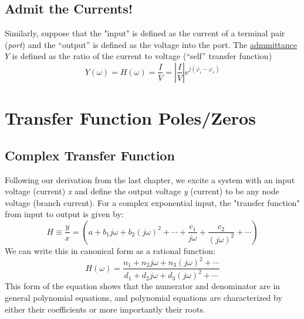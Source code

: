 \subsection{Admit the Currents!}

Similarly, suppose that the "input" is defined as the current of a terminal pair (\textit{port}) and the “output” is defined as the voltage into the port. The \underline{admmittance} $Y$ is defined as the ratio of the current to voltage (“self” transfer function)
 \begin{equation}
Y(\omega ) = H(\omega ) = \frac{I}{V} = \left| {\frac{I}{V}} \right|{e^{j({\varphi _i} - {\varphi _v})}}
\end{equation}




\section{Transfer Function Poles/Zeros}





\subsection{Complex Transfer Function}

Following our derivation from the last chapter, we excite a system with an input voltage (current) \textit{x} and define the output voltage \textit{y} (current) to be any node voltage (branch current).  For a complex exponential input, the "transfer function" from input to output is given by:
\begin{equation}
	H \equiv \frac{y}{x} = \left( {a + {b_1}j\omega  + {b_2}{{(j\omega )}^2} +  \cdots  + \frac{{{c_1}}}{{j\omega }} + \frac{{{c_2}}}{{{{(j\omega )}^2}}} +  \cdots } \right)
\end{equation}
 We can write this in canonical form as a rational function:
\begin{equation}
	H(\omega ) = \frac{{{n_1} + {n_2}j\omega  + {n_3}{{(j\omega )}^2} +  \cdots }}{{{d_1} + {d_2}j\omega  + {d_3}{{(j\omega )}^2} +  \cdots }}
\end{equation}
This form of the equation shows that the numerator and denominator are in general polynomial equations, and polynomial equations are characterized by either their coefficients or more importantly their roots. 

